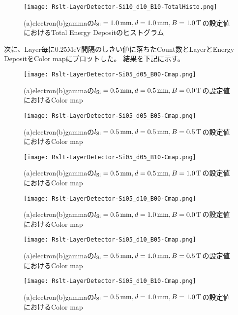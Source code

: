\documentclass[a4paper,10pt]{jreport}
\begin{document}
\begin{figure}[H]
	\center
	\texttt{[image: Rslt-LayerDetector-Si10\_d10\_B10-TotalHisto.png]}
	\caption{(a)electron(b)gammaの$l_{\rm{Si}}=\SI{1.0}{mm}, d=\SI{1.0}{mm}, B=\SI{1.0}{T}$の設定値におけるTotal Energy Depositのヒストグラム}
	\label{Rslt-LayerDetector-Si05_d05_B00-TotalHisto}
\end{figure}

次に、Layer毎に0.25MeV間隔のしきい値に落ちたCount数とLayerとEnergy DepositをColor mapにプロットした。
結果を下記に示す。

\begin{figure}[H]
	\center
	\texttt{[image: Rslt-LayerDetector-Si05\_d05\_B00-Cmap.png]}
	\caption{(a)electron(b)gammaの$l_{\rm{Si}}=\SI{0.5}{mm}, d=\SI{0.5}{mm}, B=\SI{0.0}{T}$の設定値におけるColor map}
	\label{Rslt-LayerDetector-Si05_d05_B00-Cmap}
\end{figure}

\begin{figure}[H]
	\center
	\texttt{[image: Rslt-LayerDetector-Si05\_d05\_B05-Cmap.png]}
	\caption{(a)electron(b)gammaの$l_{\rm{Si}}=\SI{0.5}{mm}, d=\SI{0.5}{mm}, B=\SI{0.5}{T}$の設定値におけるColor map}
	\label{Rslt-LayerDetector-Si05_d05_B05-Cmap}
\end{figure}

\begin{figure}[H]
	\center
	\texttt{[image: Rslt-LayerDetector-Si05\_d05\_B10-Cmap.png]}
	\caption{(a)electron(b)gammaの$l_{\rm{Si}}=\SI{0.5}{mm}, d=\SI{0.5}{mm}, B=\SI{1.0}{T}$の設定値におけるColor map}
	\label{Rslt-LayerDetector-Si05_d05_B10-Cmap}
\end{figure}

\begin{figure}[H]
	\center
	\texttt{[image: Rslt-LayerDetector-Si05\_d10\_B00-Cmap.png]}
	\caption{(a)electron(b)gammaの$l_{\rm{Si}}=\SI{0.5}{mm}, d=\SI{1.0}{mm}, B=\SI{0.0}{T}$の設定値におけるColor map}
	\label{Rslt-LayerDetector-Si05_d10_B00-Cmap}
\end{figure}

\begin{figure}[H]
	\center
	\texttt{[image: Rslt-LayerDetector-Si05\_d10\_B05-Cmap.png]}
	\caption{(a)electron(b)gammaの$l_{\rm{Si}}=\SI{0.5}{mm}, d=\SI{1.0}{mm}, B=\SI{0.5}{T}$の設定値におけるColor map}
	\label{Rslt-LayerDetector-Si05_d10_B05-Cmap}
\end{figure}

\begin{figure}[H]
	\center
	\texttt{[image: Rslt-LayerDetector-Si05\_d10\_B10-Cmap.png]}
	\caption{(a)electron(b)gammaの$l_{\rm{Si}}=\SI{0.5}{mm}, d=\SI{1.0}{mm}, B=\SI{1.0}{T}$の設定値におけるColor map}
	\label{Rslt-LayerDetector-Si05_d10_B10-Cmap}
\end{figure}
\end{document}
